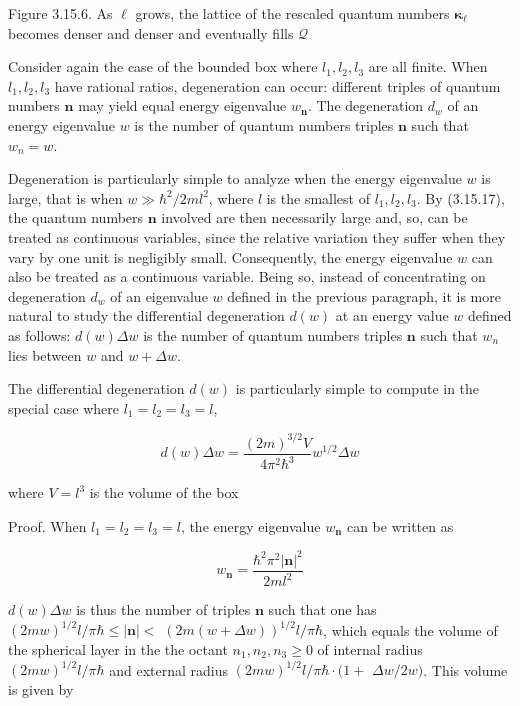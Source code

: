 \documentclass{article}
\begin{document}
Figure 3.15.6. As $\ell$ grows, the lattice of the rescaled quantum numbers $\boldsymbol{\kappa}_{\ell}$ becomes denser and denser and eventually fills $\mathcal{Q}$

Consider again the case of the bounded box where $l_{1}, l_{2}, l_{3}$ are all finite. When $l_{1}, l_{2}, l_{3}$ have rational ratios, degeneration can occur: different triples of quantum numbers $\boldsymbol{n}$ may yield equal energy eigenvalue $w_{\boldsymbol{n}}$. The degeneration $d_{w}$ of an energy eigenvalue $w$ is the number of quantum numbers triples $\boldsymbol{n}$ such that $w_{n}=w$.

Degeneration is particularly simple to analyze when the energy eigenvalue $w$ is large, that is when $w \gg \hbar^{2} / 2 m l^{2}$, where $l$ is the smallest of $l_{1}, l_{2}, l_{3}$. By (3.15.17), the quantum numbers $\boldsymbol{n}$ involved are then necessarily large and, so, can be treated as continuous variables, since the relative variation they suffer when they vary by one unit is negligibly small. Consequently, the energy eigenvalue $w$ can also be treated as a continuous variable. Being so, instead of concentrating on degeneration $d_{w}$ of an eigenvalue $w$ defined in the previous paragraph, it is more natural to study the differential degeneration $d(w)$ at an energy value $w$ defined as follows: $d(w) \Delta w$ is the number of quantum numbers triples $\boldsymbol{n}$ such that $w_{n}$ lies between $w$ and $w+\Delta w$.

The differential degeneration $d(w)$ is particularly simple to compute in the special case where $l_{1}=l_{2}=l_{3}=l$,
 
\begin{equation*}
d(w) \Delta w=\frac{(2 m)^{3 / 2} V}{4 \pi^{2} \hbar^{3}} w^{1 / 2} \Delta w \tag{3.15.93}
\end{equation*}
 
where $V=l^{3}$ is the volume of the box

Proof. When $l_{1}=l_{2}=l_{3}=l$, the energy eigenvalue $w_{\boldsymbol{n}}$ can be written as
 
\begin{equation*}
w_{\boldsymbol{n}}=\frac{\hbar^{2} \pi^{2}|\boldsymbol{n}|^{2}}{2 m l^{2}} \tag{3.15.94}
\end{equation*}
 
$d(w) \Delta w$ is thus the number of triples $\boldsymbol{n}$ such that one has $(2 m w)^{1 / 2} l / \pi \hbar \leq|\boldsymbol{n}|<$ $(2 m(w+\Delta w))^{1 / 2} l / \pi \hbar$, which equals the volume of the spherical layer in the the octant $n_{1}, n_{2}, n_{3} \geq 0$ of internal radius $(2 m w)^{1 / 2} l / \pi \hbar$ and external radius $(2 m w)^{1 / 2} l / \pi \hbar \cdot(1+$ $\Delta w / 2 w)$. This volume is given by
 
\end{document}
